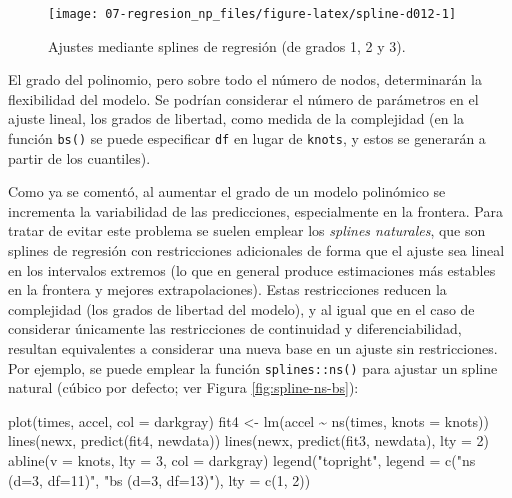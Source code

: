 \documentclass[
]{book}
\newenvironment{Shaded}{\begin{snugshade}}{\end{snugshade}}
\newcommand{\AttributeTok}[1]{\textcolor[rgb]{0.77,0.63,0.00}{#1}}
\newcommand{\DecValTok}[1]{\textcolor[rgb]{0.00,0.00,0.81}{#1}}
\newcommand{\FunctionTok}[1]{\textcolor[rgb]{0.00,0.00,0.00}{#1}}
\newcommand{\NormalTok}[1]{#1}
\newcommand{\OtherTok}[1]{\textcolor[rgb]{0.56,0.35,0.01}{#1}}
\newcommand{\SpecialCharTok}[1]{\textcolor[rgb]{0.00,0.00,0.00}{#1}}
\newcommand{\StringTok}[1]{\textcolor[rgb]{0.31,0.60,0.02}{#1}}
\theoremstyle{break}
\theoremstyle{nonumberplain}
\begin{document}
\begin{figure}[!htb]

{\centering \texttt{[image: 07-regresion\_np\_files/figure-latex/spline-d012-1]} 

}

\caption{Ajustes mediante splines de regresión (de grados 1, 2 y 3).}\label{fig:spline-d012}
\end{figure}

El grado del polinomio, pero sobre todo el número de nodos, determinarán la flexibilidad del modelo.
Se podrían considerar el número de parámetros en el ajuste lineal, los grados de libertad, como medida de la complejidad (en la función \texttt{bs()} se puede especificar \texttt{df} en lugar de \texttt{knots}, y estos se generarán a partir de los cuantiles).

Como ya se comentó, al aumentar el grado de un modelo polinómico se incrementa la variabilidad de las predicciones, especialmente en la frontera.
Para tratar de evitar este problema se suelen emplear los \emph{splines naturales}, que son splines de regresión con restricciones adicionales de forma que el ajuste sea lineal en los intervalos extremos (lo que en general produce estimaciones más estables en la frontera y mejores extrapolaciones).
Estas restricciones reducen la complejidad (los grados de libertad del modelo), y al igual que en el caso de considerar únicamente las restricciones de continuidad y diferenciabilidad, resultan equivalentes a considerar una nueva base en un ajuste sin restricciones.
Por ejemplo, se puede emplear la función \texttt{splines::ns()} para ajustar un spline natural (cúbico por defecto; ver Figura \ref{fig:spline-ns-bs}):



\begin{Shaded}
\begin{Highlighting}[]
\FunctionTok{plot}\NormalTok{(times, accel, }\AttributeTok{col =} \StringTok{\textquotesingle{}darkgray\textquotesingle{}}\NormalTok{)}
\NormalTok{fit4 }\OtherTok{\textless{}{-}} \FunctionTok{lm}\NormalTok{(accel }\SpecialCharTok{\textasciitilde{}} \FunctionTok{ns}\NormalTok{(times, }\AttributeTok{knots =}\NormalTok{ knots))}
\FunctionTok{lines}\NormalTok{(newx, }\FunctionTok{predict}\NormalTok{(fit4, newdata))}
\FunctionTok{lines}\NormalTok{(newx, }\FunctionTok{predict}\NormalTok{(fit3, newdata), }\AttributeTok{lty =} \DecValTok{2}\NormalTok{)}
\FunctionTok{abline}\NormalTok{(}\AttributeTok{v =}\NormalTok{ knots, }\AttributeTok{lty =} \DecValTok{3}\NormalTok{, }\AttributeTok{col =} \StringTok{\textquotesingle{}darkgray\textquotesingle{}}\NormalTok{)}
\FunctionTok{legend}\NormalTok{(}\StringTok{"topright"}\NormalTok{, }\AttributeTok{legend =} \FunctionTok{c}\NormalTok{(}\StringTok{"ns (d=3, df=11)"}\NormalTok{, }\StringTok{"bs (d=3, df=13)"}\NormalTok{), }\AttributeTok{lty =} \FunctionTok{c}\NormalTok{(}\DecValTok{1}\NormalTok{, }\DecValTok{2}\NormalTok{))}
\end{Highlighting}
\end{Shaded}
\end{document}
